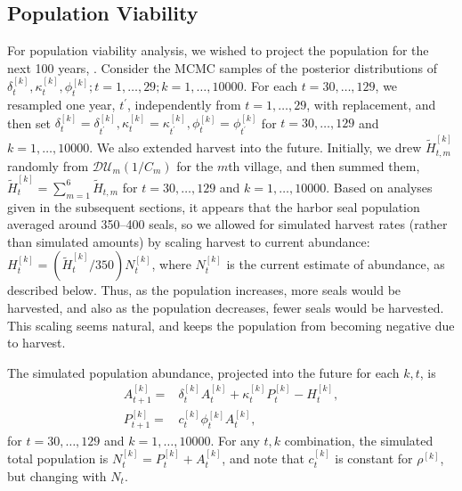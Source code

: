 \documentclass[]{risa}\usepackage[]{graphicx}\usepackage[]{color}
\def\upp{^{\prime}}
\begin{document}

\subsection{Population Viability} \label{sec:PVA}

For population viability analysis, we wished to project the population for the next 100 years, \citet[e.g.,][]{Ver:popu:2002}. Consider the MCMC samples of the posterior distributions of $\delta^{[k]}_{t}, \kappa^{[k]}_t, \phi^{[k]}_t; t = 1,\ldots,29; k = 1,\ldots,10000$. For each $t = 30,\ldots,129$, we resampled one year, $t\upp$, independently from $t = 1,\ldots,29$, with replacement, and then set $\delta^{[k]}_{t} = \delta^{[k]}_{t\upp}, \kappa^{[k]}_t = \kappa^{[k]}_{t\upp}, \phi^{[k]}_t = \phi^{[k]}_{t\upp}$ for $t = 30,\ldots,129$ and $k = 1,\ldots,10000$.  We also extended harvest into the future.  Initially, we drew $\tilde{H}_{t,m}^{[k]}$ randomly from $\mathcal{DU}_m(1/C_m)$ for the $m$th village, and then summed them, $\tilde{H}_t^{[k]} = \sum_{m=1}^6 \tilde{H}_{t,m}$ for $t = 30,\ldots,129$ and $k = 1,\ldots,10000$. Based on analyses given in the subsequent sections, it appears that the harbor seal population averaged around 350--400 seals, so we allowed for simulated harvest rates (rather than simulated amounts) by scaling harvest to current abundance: $H_t^{[k]} = (\tilde{H}_t^{[k]}/350)N_t^{[k]}$, where $N_t^{[k]}$ is the current estimate of abundance, as described below.  Thus, as the population increases, more seals would be harvested, and also as the population decreases, fewer seals would be harvested.  This scaling seems natural, and keeps the population from becoming negative due to harvest. 

The simulated population abundance, projected into the future for each $k,t$, is 
\begin{align*}
		A^{[k]}_{t+1} =& \delta^{[k]}_{t}A^{[k]}_t + \kappa^{[k]}_{t} P^{[k]}_t - H^{[k]}_{t}, \\
		P^{[k]}_{t+1} =& c^{[k]}_t\phi^{[k]}_t A^{[k]}_t,
\end{align*}
for $t = 30,\ldots,129$ and $k = 1,\ldots,10000$. For any $t,k$ combination, the simulated total population is $N_t^{[k]} = P_t^{[k]} + A_t^{[k]}$, and note that $c^{[k]}_t$ is constant for $\rho^{[k]}$, but changing with $N_t$.
\end{document}
